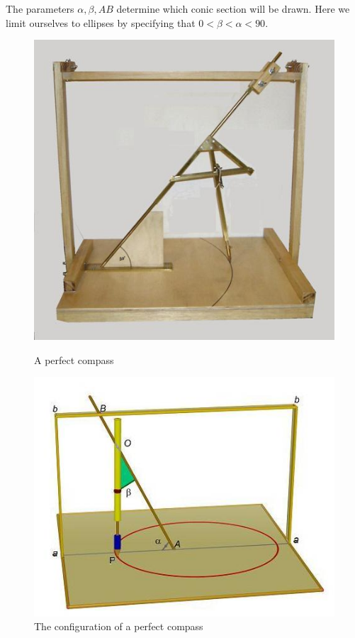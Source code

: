The parameters $\alpha, \beta, AB$ determine which conic section will be drawn. Here we limit ourselves to ellipses by specifying that $0< \beta <\alpha< 90$. 
\begin{figure}[t]
\begin{minipage}{.45\textwidth}
\begin{center}
\includegraphics[width=.9\textwidth,keepaspectratio=true]{perfect1.jpg}
\medskip
\caption{A perfect compass}\label{f.perfect-image1}
\end{center}
\end{minipage}
\hfill
\begin{minipage}{.525\textwidth}
\begin{center}
\includegraphics[width=\textwidth,keepaspectratio=true]{perfect2.jpg}
\vspace*{2pt}
\caption{The configuration of a perfect compass}\label{f.perfect-image2}
\end{center}
\end{minipage}
\end{figure}


